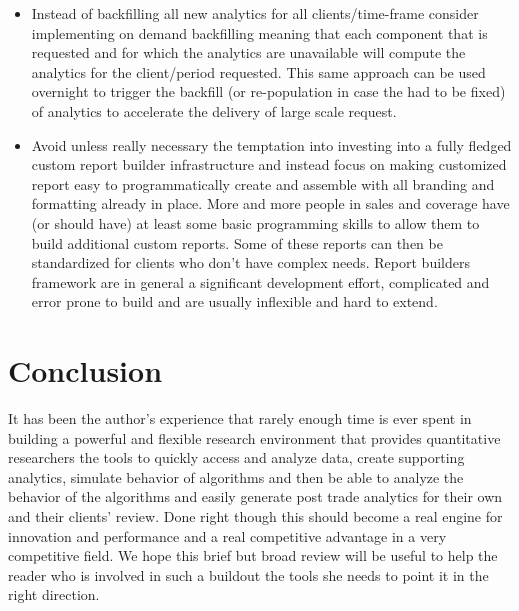 \begin{itemize}
\item Instead of backfilling all new analytics for all clients/time-frame consider implementing on demand backfilling meaning that each component that is requested and for which the analytics are unavailable will compute the analytics for the client/period requested. This same approach can be used overnight to trigger the backfill  (or re-population in case the had to be fixed) of analytics to accelerate the delivery of large scale request.

\item Avoid unless really necessary the temptation into investing into a fully fledged custom report builder infrastructure and instead focus on making customized report easy to programmatically create and assemble with all branding and formatting already in place. More and more people in sales and coverage have (or should have) at least some basic programming skills to allow them to build additional custom reports. Some of these reports can then be standardized for clients who don't have complex needs. Report builders framework are in general a significant development effort, complicated and error prone to build and are usually inflexible and hard to extend. 
\end{itemize}

 

\section{Conclusion}

It has been the author's experience that rarely enough time is ever spent in building a powerful and flexible research environment that provides quantitative researchers the tools to quickly access and analyze data, create supporting analytics, simulate behavior of algorithms and then be able to analyze the behavior of the algorithms and easily generate post trade analytics for their own and their clients' review. Done right though this should become a real engine for innovation and performance and a real competitive advantage in a very competitive field. We hope this brief but broad review will be useful to help the reader who is involved in such a buildout the tools she needs to point it in the right direction.
